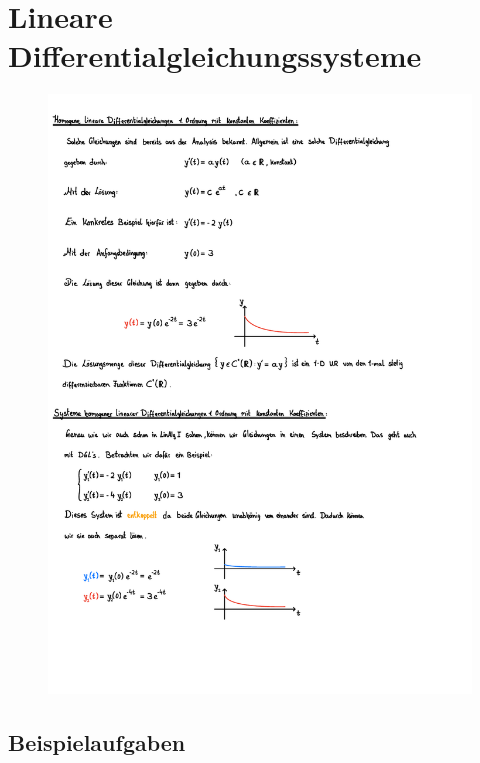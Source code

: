 \section{Lineare Differentialgleichungssysteme}
\begin{figure}[h!]
    \includegraphics[page=1, scale=0.842]{pdf/08_Lineare_diff_systeme.pdf}
\end{figure}
\newpage



\subsection{Beispielaufgaben}

